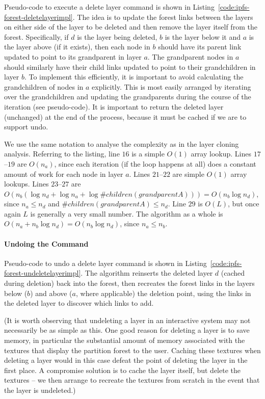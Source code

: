 Pseudo-code to execute a delete layer command is shown in Listing~\ref{code:ipfs-forest-deletelayerimpl}. The idea is to update the forest links between the layers on either side of the layer to be deleted and then remove the layer itself from the forest. Specifically, if $d$ is the layer being deleted, $b$ is the layer below it and $a$ is the layer above (if it exists), then each node in $b$ should have its parent link updated to point to its grandparent in layer $a$. The grandparent nodes in $a$ should similarly have their child links updated to point to their grandchildren in layer $b$. To implement this efficiently, it is important to avoid calculating the grandchildren of nodes in $a$ explicitly. This is most easily arranged by iterating over the grandchildren and updating the grandparents during the course of the iteration (see pseudo-code). It is important to return the deleted layer (unchanged) at the end of the process, because it must be cached if we are to support undo.

We use the same notation to analyse the complexity as in the layer cloning analysis. Referring to the listing, line $16$ is a simple $O(1)$ array lookup. Lines $17$--$19$ are $O(n_a)$, since each iteration (if the loop happens at all) does a constant amount of work for each node in layer $a$. Lines $21$--$22$ are simple $O(1)$ array lookups. Lines $23$--$27$ are $O(n_b (\log n_d + \log n_a + \log \#\mathit{children}(\mathit{grandparentA}))) = O(n_b \log n_d)$, since $n_a \le n_d$ and $\#\mathit{children}(\mathit{grandparentA}) \le n_d$. Line $29$ is $O(L)$, but once again $L$ is generally a very small number. The algorithm as a whole is $O(n_a + n_b \log n_d) = O(n_b \log n_d)$, since $n_a \le n_b$.

\paragraph{Undoing the Command}

Pseudo-code to undo a delete layer command is shown in Listing~\ref{code:ipfs-forest-undeletelayerimpl}. The algorithm reinserts the deleted layer $d$ (cached during deletion) back into the forest, then recreates the forest links in the layers below ($b$) and above ($a$, where applicable) the deletion point, using the links in the deleted layer to discover which links to add.

(It is worth observing that undeleting a layer in an interactive system may not necessarily be as simple as this. One good reason for deleting a layer is to save memory, in particular the substantial amount of memory associated with the textures that display the partition forest to the user. Caching these textures when deleting a layer would in this case defeat the point of deleting the layer in the first place. A compromise solution is to cache the layer itself, but delete the textures -- we then arrange to recreate the textures from scratch in the event that the layer is undeleted.)

